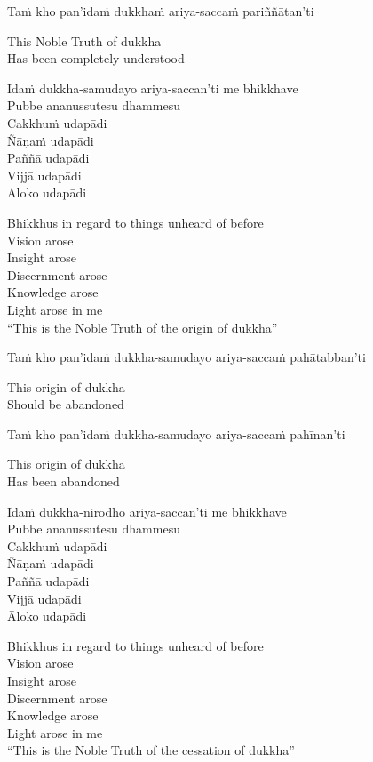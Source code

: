 Taṁ kho pan’idaṁ dukkhaṁ ariya-saccaṁ pariññātan’ti

\begin{cprenglish}
  This Noble Truth of dukkha\\
  Has been completely understood
\end{cprenglish}

Idaṁ dukkha-samudayo ariya-saccan’ti me bhikkhave\\
Pubbe ananussutesu dhammesu\\
Cakkhuṁ udapādi\\
Ñāṇaṁ udapādi\\
Paññā udapādi\\
Vijjā udapādi\\
Āloko udapādi

\begin{cprenglish}
  Bhikkhus in regard to things unheard of before\\
  Vision arose\\
  Insight arose\\
  Discernment arose\\
  Knowledge arose\\
  Light arose in me\\
  “This is the Noble Truth of the origin of dukkha”
\end{cprenglish}

Taṁ kho pan’idaṁ dukkha-samudayo ariya-saccaṁ pahātabban’ti

\begin{cprenglish}
  This origin of dukkha\\
  Should be abandoned
\end{cprenglish}

Taṁ kho pan’idaṁ dukkha-samudayo ariya-saccaṁ pahīnan’ti

\begin{cprenglish}
  This origin of dukkha\\
  Has been abandoned
\end{cprenglish}

Idaṁ dukkha-nirodho ariya-saccan’ti me bhikkhave\\
Pubbe ananussutesu dhammesu\\
Cakkhuṁ udapādi\\
Ñāṇaṁ udapādi\\
Paññā udapādi\\
Vijjā udapādi\\
Āloko udapādi

\begin{cprenglish}
  Bhikkhus in regard to things unheard of before\\
  Vision arose\\
  Insight arose\\
  Discernment arose\\
  Knowledge arose\\
  Light arose in me\\
  “This is the Noble Truth of the cessation of dukkha”
\end{cprenglish}

